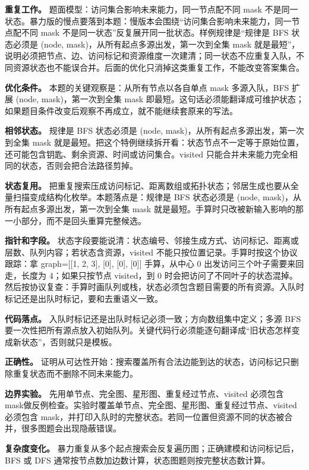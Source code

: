 \textbf{重复工作。} 题面模型：访问集合影响未来能力，同一节点配不同 mask 不是同一状态。暴力版的慢点要落到本题：慢版本会围绕“访问集合影响未来能力，同一节点配不同 mask 不是同一状态”反复展开同一批状态。样例规律是“规律是 BFS 状态必须是 (node, mask)，从所有起点多源出发，第一次到全集 mask 就是最短”，说明必须把节点、边、访问标记和资源维度一次建清；同一状态不应重复入队，不同资源状态也不能误合并。后面的优化只消掉这类重复工作，不能改变答案集合。

\textbf{优化条件。} 本题的关键观察是：从所有节点以各自单点 mask 多源入队，BFS 扩展 (node, mask)，第一次到全集 mask 即最短。这句话必须能翻译成可维护状态；如果题目条件改变后观察不再成立，就不能继续套原来的写法。

\textbf{相邻状态。} 规律是 BFS 状态必须是 (node, mask)，从所有起点多源出发，第一次到全集 mask 就是最短。把这个特例继续拆开看：状态节点不一定等于原始位置，还可能包含钥匙、剩余资源、时间或访问集合。visited 只能合并未来能力完全相同的状态，否则会把合法路径剪掉。

\textbf{状态复用。} 把重复搜索压成访问标记、距离数组或拓扑状态；邻居生成也要从全量扫描变成结构化枚举。本题落点是：规律是 BFS 状态必须是 (node, mask)，从所有起点多源出发，第一次到全集 mask 就是最短。手算时只改被新输入影响的那一小部分，而不是回头重算完整候选。

\textbf{指针和字段。} 状态字段要能说清：状态编号、邻接生成方式、访问标记、距离或层数、队列内容；若状态含资源，visited 不能只按位置记录。手算时按这个协议跟踪：拿 graph=[[1, 2, 3], [0], [0], [0]] 手算，从中心 0 出发访问三个叶子需要来回走，长度为 4；如果只按节点 visited，到 0 时会把访问了不同叶子的状态混掉。然后按协议复查：手算时画队列或栈，状态必须包含题目需要的所有资源。入队时标记还是出队时标记，要和去重语义一致。

\textbf{代码落点。} 入队时标记还是出队时标记必须一致；方向数组集中定义；多源 BFS 要一次性把所有源点放入初始队列。关键代码行必须能逐句翻译成“旧状态怎样变成新状态”，否则就只是模板。

\textbf{正确性。} 证明从可达性开始：搜索覆盖所有合法边能到达的状态，访问标记只删除重复状态而不删除不同未来能力。

\textbf{边界实验。} 先用单节点、完全图、星形图、重复经过节点、visited 必须包含 mask做反例检查。实验时覆盖单节点、完全图、星形图、重复经过节点、visited 必须包含 mask，并打印入队时的完整状态。若同一位置但资源不同的状态被合并，很多图题会出现隐蔽错误。

\textbf{复杂度变化。} 暴力重复从多个起点搜索会反复遍历图；正确建模和访问标记后，BFS 或 DFS 通常按节点数加边数计算，状态图题则按完整状态数计算。

